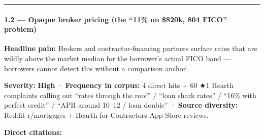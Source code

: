 \documentclass[
  10pt,
]{article}
\begin{document}
\begin{center}\rule{0.5\linewidth}{0.5pt}\end{center}

\hypertarget{opaque-broker-pricing-the-11-on-820k-804-fico-problem}{%
\paragraph{1.2 --- Opaque broker pricing (the ``11\% on \$820k, 804 FICO''
problem)}\label{opaque-broker-pricing-the-11-on-820k-804-fico-problem}}

\textbf{Headline pain:} Brokers and contractor-financing partners surface rates that are wildly
above the market median for the borrower's actual FICO band --- borrowers cannot detect this without
a comparison anchor.

\textbf{Severity:} \textbf{High} · \textbf{Frequency in corpus:} 4 direct hits + 60 ★1 Hearth
complaints calling out ``rates through the roof'' / ``loan shark rates'' / ``16\% with perfect
credit'' / ``APR around 10--12 / loan double'' · \textbf{Source diversity:} Reddit r/mortgages +
Hearth-for-Contractors App Store reviews.

\textbf{Direct citations:}
\end{document}
